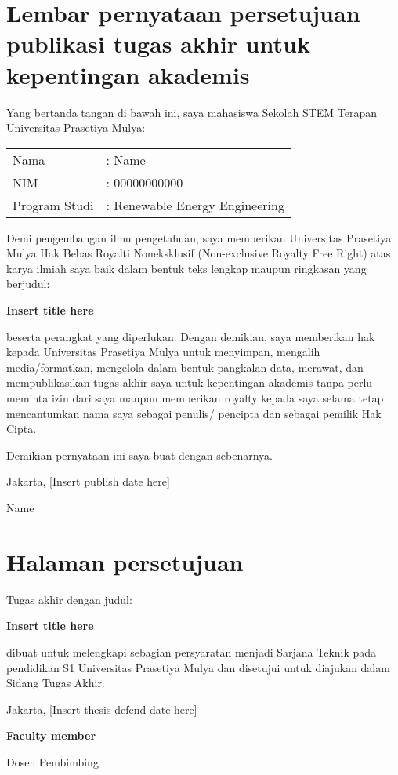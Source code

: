 \section*{Lembar pernyataan persetujuan publikasi tugas akhir untuk kepentingan akademis}
\noindent Yang bertanda tangan di bawah ini, saya mahasiswa Sekolah STEM Terapan Universitas Prasetiya Mulya: \par
\vspace{1cm}
\begin{tabular}{l l}
    Nama           & : Name \\
    NIM            & : 00000000000 \\
    Program Studi  & : Renewable Energy Engineering \\
\end{tabular} \vspace{1cm} \par
\noindent Demi pengembangan ilmu pengetahuan, saya memberikan Universitas Prasetiya Mulya Hak Bebas Royalti Noneksklusif (Non-exclusive Royalty Free Right) atas karya ilmiah saya baik dalam bentuk teks lengkap maupun ringkasan yang berjudul: \par
\begin{center}
    \textbf{Insert title here}
\end{center} \par
\noindent beserta perangkat yang diperlukan. Dengan demikian, saya memberikan hak kepada Universitas Prasetiya Mulya untuk menyimpan, mengalih media/formatkan, mengelola dalam bentuk pangkalan data, merawat, dan mempublikasikan tugas akhir saya untuk kepentingan akademis tanpa perlu meminta izin dari saya maupun memberikan royalty kepada saya selama tetap mencantumkan nama saya sebagai penulis/ pencipta dan sebagai pemilik Hak Cipta. \par
\vspace{1cm} \noindent Demikian pernyataan ini saya buat dengan sebenarnya. \par
\vspace{4cm}
\noindent Jakarta, [Insert publish date here] \par
\vspace{1cm}
\noindent Name

\section*{Halaman persetujuan}
\noindent Tugas akhir dengan judul:
\begin{center}
    \textbf{Insert title here}
\end{center} \par
\noindent dibuat untuk melengkapi sebagian persyaratan menjadi Sarjana Teknik pada pendidikan S1 Universitas Prasetiya Mulya dan disetujui untuk diajukan dalam Sidang Tugas Akhir. \par
\vspace{15cm}
\noindent Jakarta, [Insert thesis defend date here] \par
\vspace{1cm}
\noindent \textbf{Faculty member} \par
\noindent Dosen Pembimbing